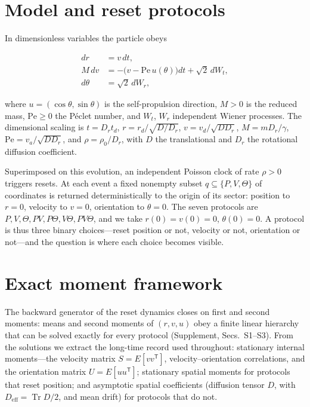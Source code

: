 \section{Model and reset protocols}\label{model}

In dimensionless variables the particle obeys

\[
\begin{aligned}
d r&=v\,dt,\\
M\,dv&=-\bigl(v-\mathrm{Pe}\,u(\theta)\bigr)dt+\sqrt2\,dW_t,\\
d\theta&=\sqrt2\,dW_r,
\end{aligned}
\]

where $u=(\cos\theta,\sin\theta)$ is the self-propulsion direction, $M>0$ is the reduced mass, $\mathrm{Pe}\ge0$ the P\'eclet number, and $W_t$, $W_r$ independent Wiener processes. The dimensional scaling is $t=D_rt_d$, $r=r_d/\sqrt{D/D_r}$, $v=v_d/\sqrt{DD_r}$, $M=mD_r/\gamma$, $\mathrm{Pe}=v_a/\sqrt{DD_r}$, and $\rho=\rho_0/D_r$, with $D$ the translational and $D_r$ the rotational diffusion coefficient.

Superimposed on this evolution, an independent Poisson clock of rate $\rho>0$ triggers resets. At each event a fixed nonempty subset $q\subseteq\{P,V,\Theta\}$ of coordinates is returned deterministically to the origin of its sector: position to $r=0$, velocity to $v=0$, orientation to $\theta=0$. The seven protocols are $P,V,\Theta,PV,P\Theta,V\Theta,PV\Theta$, and we take $r(0)=v(0)=0$, $\theta(0)=0$. A protocol is thus three binary choices---reset position or not, velocity or not, orientation or not---and the question is where each choice becomes visible.

\section{Exact moment framework}\label{moment-framework}

The backward generator of the reset dynamics closes on first and second moments: means and second moments of $(r,v,u)$ obey a finite linear hierarchy that can be solved exactly for every protocol (Supplement, Secs.~S1--S3). From the solutions we extract the long-time record used throughout: stationary internal moments---the velocity matrix $S=E[vv^{\mathsf T}]$, velocity--orientation correlations, and the orientation matrix $U=E[uu^{\mathsf T}]$; stationary spatial moments for protocols that reset position; and asymptotic spatial coefficients (diffusion tensor $D$, with $D_{\mathrm{eff}}=\operatorname{Tr}D/2$, and mean drift) for protocols that do not.


